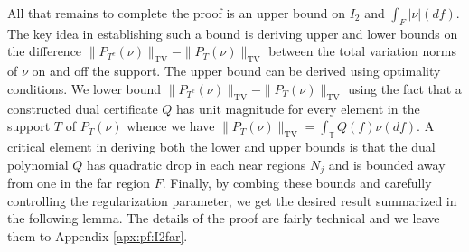 All that remains to complete the proof is an upper bound on $I_2$ and $\int_F{|\nu|(df)}$.  The key idea in establishing such a bound is deriving upper and lower bounds on the
difference $\| P_{T^c} ( \nu) \|_{{\mathrm{TV}}} - \| P_T ( \nu) \|_{{\mathrm{TV}}}$
between the total variation norms of $\nu$ on and off the support. The upper bound can be derived using optimality conditions. We lower bound $\| P_{T^c} ( \nu)
\|_{{\mathrm{TV}}} - \| P_{T} ( \nu) \|_{{\mathrm{TV}}}$ using the fact that a constructed dual
certificate $Q$ has unit magnitude for every element in the support
$T$ of $P_T ( \nu)$ whence we have $\| P_T ( \nu) \|_{{\mathrm{TV}}} = \int_{\mathbb{T}}
Q ( f) \nu ( d f)$. A critical element in deriving both the lower and upper bounds is that the dual polynomial $Q$ has quadratic drop in each near regions $N_j$ and is bounded away from one in the far region $F$. Finally, by combing these bounds and carefully controlling the regularization parameter, we get the desired result summarized in the following lemma. The details of the proof are fairly technical and we leave them to Appendix \ref{apx:pf:I2far}.

